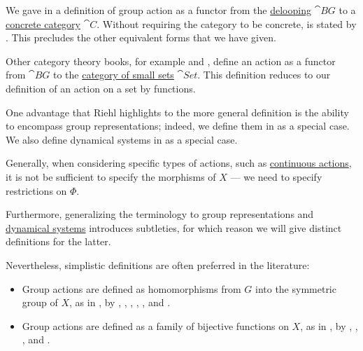 \begin{remark}\label{rem:group_action_category}
  We gave in  a definition of group action as a functor from the \hyperref[def:monoid_delooping]{delooping} \( \cat{B} G \) to a \hyperref[rem:concrete_categories]{concrete category} \( \cat{C} \). Without requiring the category to be concrete,  is stated by . This precludes the other equivalent forms that we have given.

  Other category theory books, for example \cite[example 1.2.8]{Leinster2014BasicCategoryTheory} and \cite[example 1.3.10]{Perrone2024StartingCategoryTheory}, define an action as a functor from \( \cat{B} G \) to the \hyperref[def:category_of_small_sets]{category of small sets} \( \cat{Set} \). This definition reduces to our definition of an action on a set by functions.

  One advantage that Riehl highlights to the more general definition is the ability to encompass group representations; indeed, we define them in  as a special case. We also define dynamical systems in  as a special case.

  Generally, when considering specific types of actions, such as \hyperref[def:continuous_monoid_action]{continuous actions}, it is not be sufficient to specify the morphisms of \( X \) --- we need to specify restrictions on \( \Phi \).

  Furthermore, generalizing the terminology to group representations and \hyperref[def:dynamical_system]{dynamical systems} introduces subtleties, for which reason we will give distinct definitions for the latter.

  Nevertheless, simplistic definitions are often preferred in the literature:
  \begin{itemize}
    \item Group actions are defined as homomorphisms from \( G \) into the symmetric group of \( X \), as in , by
    ,
    ,
    ,
    ,
    ,
     and
    .

    \item Group actions are defined as a family of bijective functions on \( X \), as in , by
    ,
    ,
    ,
     and
    .
  \end{itemize}
\end{remark}

